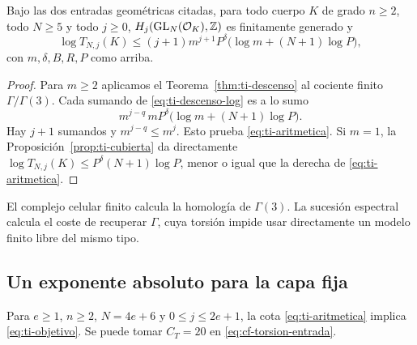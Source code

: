 \begin{teorema}
\label{thm:ti-aritmetica}
Bajo las dos entradas geométricas citadas, para todo
cuerpo $K$ de grado $n\ge2$, todo $N\ge5$ y todo $j\ge0$,
$H_j(\operatorname{GL}_N(\mathcal O_K),\mathbb{Z})$ es
finitamente generado y
\begin{equation}
 \log T_{N,j}(K)
 \le (j+1)m^{j+1}P^\delta
       \bigl(\log m+(N+1)\log P\bigr),
 \label{eq:ti-aritmetica}
\end{equation}
con $m,\delta,B,R,P$ como arriba.
\end{teorema}

\begin{proof}
Para $m\ge2$ aplicamos el Teorema~\ref{thm:ti-descenso}
al cociente finito $\Gamma/\Gamma(3)$.
Cada sumando de \eqref{eq:ti-descenso-log} es a lo sumo
\[
 m^{j-q}\,mP^\delta
       \bigl(\log m+(N+1)\log P\bigr).
\]
Hay $j+1$ sumandos y $m^{j-q}\le m^j$.
Esto prueba \eqref{eq:ti-aritmetica}.
Si $m=1$, la Proposición~\ref{prop:ti-cubierta} da directamente
$\log T_{N,j}(K)\le P^\delta(N+1)\log P$, menor o igual
que la derecha de \eqref{eq:ti-aritmetica}.
\end{proof}

El complejo celular finito calcula la homología de
$\Gamma(3)$. La sucesión espectral calcula el coste de
recuperar $\Gamma$, cuya torsión impide usar directamente
un modelo finito libre del mismo tipo.

\subsection{Un exponente absoluto para la capa fija}

\begin{proposicion}
\label{prop:ti-exponente}
Para $e\ge1$, $n\ge2$, $N=4e+6$ y $0\le j\le2e+1$,
la cota \eqref{eq:ti-aritmetica} implica
\eqref{eq:ti-objetivo}. Se puede tomar $C_T=20$ en
\eqref{eq:cf-torsion-entrada}.
\end{proposicion}

